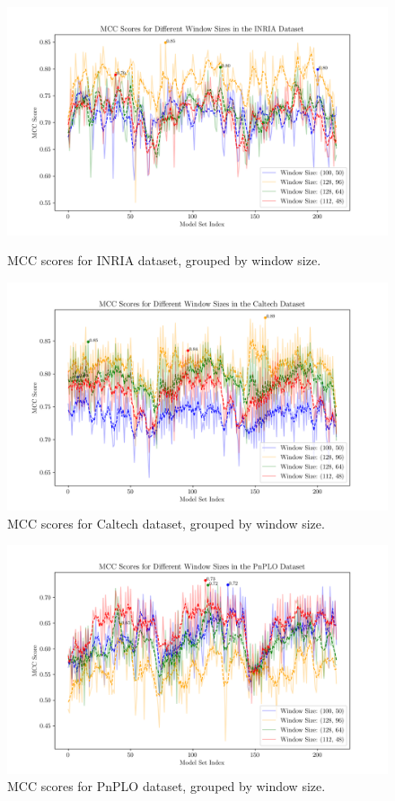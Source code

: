 \begin{figure}\
    \centering
    \includegraphics[width=0.9\linewidth]{../images/mcc_windows_INRIA.png}
    \caption{
        MCC scores for INRIA dataset, grouped by window size.
    }
    \label{fig:window_size_inria}
\end{figure}
\begin{figure}
    \centering
    \includegraphics[width=0.9\linewidth]{../images/mcc_windows_caltech_30.png}
    \caption{
        MCC scores for Caltech dataset, grouped by window size.
    }
    \label{fig:window_size_caltech}

\end{figure}
\begin{figure}
    \centering
    \includegraphics[width=0.9\linewidth]{../images/mcc_windows_PnPLO.png}
    \caption{
        MCC scores for PnPLO dataset, grouped by window size.
    }
    \label{fig:window_size_pnplo}
\end{figure}

